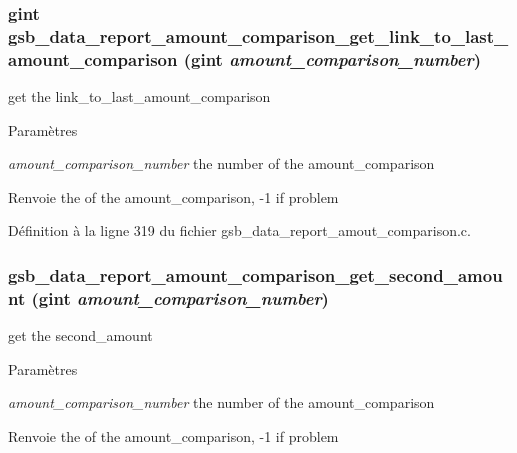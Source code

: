 \subsubsection[{gsb\_\-data\_\-report\_\-amount\_\-comparison\_\-get\_\-link\_\-to\_\-last\_\-amount\_\-comparison}]{\setlength{\rightskip}{0pt plus 5cm}gint gsb\_\-data\_\-report\_\-amount\_\-comparison\_\-get\_\-link\_\-to\_\-last\_\-amount\_\-comparison (gint {\em amount\_\-comparison\_\-number})}\label{gsb__data__report__amout__comparison_8c_a0917d321c4f62f197d4d31ea0fdcc6a4}
get the link\_\-to\_\-last\_\-amount\_\-comparison


\begin{DoxyParams}{Paramètres}
\item[{\em amount\_\-comparison\_\-number}]the number of the amount\_\-comparison\end{DoxyParams}
\begin{DoxyReturn}{Renvoie}
the of the amount\_\-comparison, -\/1 if problem 
\end{DoxyReturn}


Définition à la ligne 319 du fichier gsb\_\-data\_\-report\_\-amout\_\-comparison.c.

\subsubsection[{gsb\_\-data\_\-report\_\-amount\_\-comparison\_\-get\_\-second\_\-amount}]{ gsb\_\-data\_\-report\_\-amount\_\-comparison\_\-get\_\-second\_\-amount (gint {\em amount\_\-comparison\_\-number})}\label{gsb__data__report__amout__comparison_8c_aa34007389fb6e92a19ef95edc1803d8b}
get the second\_\-amount


\begin{DoxyParams}{Paramètres}
\item[{\em amount\_\-comparison\_\-number}]the number of the amount\_\-comparison\end{DoxyParams}
\begin{DoxyReturn}{Renvoie}
the of the amount\_\-comparison, -\/1 if problem 
\end{DoxyReturn}


